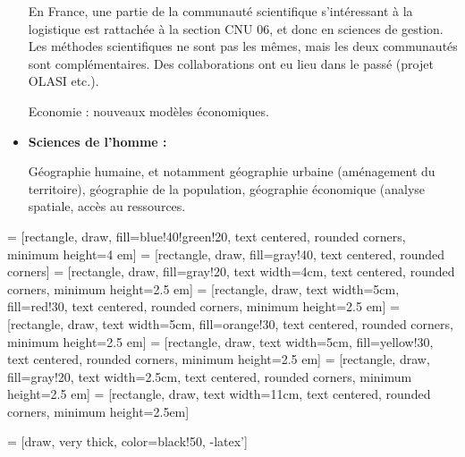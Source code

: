 \begin{itemize}
	    En France, une partie de la communauté scientifique s'intéressant à la logistique est rattachée à la section CNU 06, et donc en sciences de gestion. Les méthodes scientifiques ne sont pas les mêmes, mais les deux communautés sont complémentaires. Des collaborations ont eu lieu dans le passé (projet OLASI etc.). 
	    
	    Economie : nouveaux modèles économiques. 
	    
	    \item \textbf{Sciences de l'homme : }
	    
	    Géographie humaine, et notamment géographie urbaine (aménagement du territoire), géographie de la population, géographie économique (analyse spatiale, accès au ressources. 
	    
	\end{itemize}
	
		
		
 = [rectangle, draw, fill=blue!40!green!20, text centered, rounded corners, minimum height=4 em]		
 = [rectangle, draw, fill=gray!40, text centered, rounded corners]		
 = [rectangle, draw, fill=gray!20, text width=4cm, text centered, rounded corners, minimum height=2.5 em]
 = [rectangle, draw, text width=5cm, fill=red!30,  text centered, rounded corners, minimum height=2.5 em]
 = [rectangle, draw, text width=5cm, fill=orange!30, text centered, rounded corners, minimum height=2.5 em]
 = [rectangle, draw, text width=5cm, fill=yellow!30, text centered, rounded corners, minimum height=2.5 em]
 = [rectangle, draw, fill=gray!20, text width=2.5cm, text centered, rounded corners, minimum height=2.5 em]
 = [rectangle, draw, text width=11cm, text centered, rounded corners, minimum height=2.5em]

 = [draw, very thick, color=black!50, -latex']

